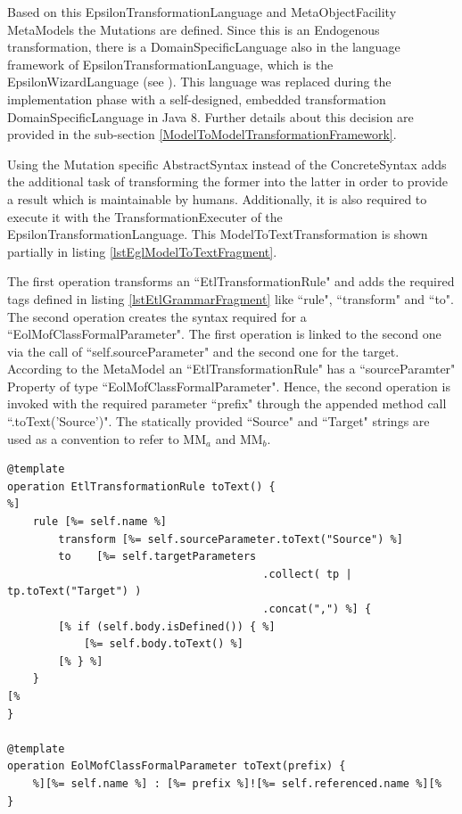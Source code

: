 Based on this \Gls{EpsilonTransformationLanguage} and \Gls{MetaObjectFacility} \glspl{MetaModel} the \glspl{Mutation} are defined. Since this is an \gls{Endogenous} transformation, there is a \gls{DomainSpecificLanguage} also in the language framework of \gls{EpsilonTransformationLanguage}, which is the \gls{EpsilonWizardLanguage} (see \cite{Kolovos2013}). This language was replaced during the implementation phase with a self-designed, embedded transformation \gls{DomainSpecificLanguage} in Java 8. Further details about this decision are provided in the sub-section \ref{ModelToModelTransformationFramework}.

Using the \gls{Mutation} specific \gls{AbstractSyntax} instead of the \gls{ConcreteSyntax} adds the additional task of transforming the former into the latter in order to provide a result which is maintainable by humans. Additionally, it is also required to execute it with the \gls{TransformationExecuter} of the \gls{EpsilonTransformationLanguage}. This \gls{ModelToTextTransformation} is shown partially in listing \ref{lstEglModelToTextFragment}. %

The first operation transforms an ``EtlTransformationRule" and adds the required tags defined in listing \ref{lstEtlGrammarFragment} like ``rule", ``transform" and ``to". The second operation creates the syntax required for a ``EolMofClassFormalParameter". The first operation is linked to the second one via the call of ``self.sourceParameter" and the second one for the target. According to the \gls{MetaModel} an ``EtlTransformationRule" has a ``sourceParamter" \gls{Property} of type ``EolMofClassFormalParameter". Hence, the second operation is invoked with the required parameter ``prefix" through the appended method call ``.toText('Source')". The statically provided ``Source" and ``Target" strings are used as a convention to refer to MM$_a$ and MM$_b$.

\begin{lstlisting}[language=EGL,caption={\Gls{ModelToTextTransformation} of the \gls{AbstractSyntax} (\Gls{EpsilonTransformationLanguage} \gls{MetaModel}) into the \gls{ConcreteSyntax} (\Gls{EpsilonTransformationLanguage} \gls{Grammar}) specified in the \Gls{EpsilonGenerationLanguage} (Simplified fragment)},label={lstEglModelToTextFragment}]
@template
operation EtlTransformationRule toText() { 	
%]
	rule [%= self.name %]
		transform [%= self.sourceParameter.toText("Source") %]
		to	  [%= self.targetParameters
										.collect( tp | tp.toText("Target") )
										.concat(",") %] {
		[% if (self.body.isDefined()) { %]
			[%= self.body.toText() %]
		[% } %]
	}
[%
} 

@template
operation EolMofClassFormalParameter toText(prefix) { 
	%][%= self.name %] : [%= prefix %]![%= self.referenced.name %][%
}
\end{lstlisting}

